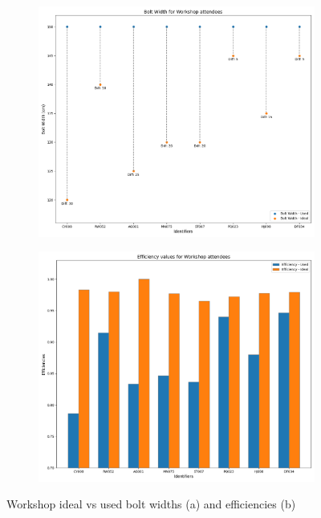 \begin{figure}[H]
    \centering
    \begin{subfigure}[b]{0.45\textwidth}
        \centering
        \includegraphics[width=\textwidth]{Images/Workshop_BoltWidths_Scatter.png}
        \caption{}
        \label{fig:workshop_bolt_widths}
    \end{subfigure}
    \vfill
    \begin{subfigure}[b]{0.45\textwidth}
        \centering
        \includegraphics[width=\textwidth]{Images/Workshop_Eff_bar.png}
        \caption{}
        \label{fig:workshop_efficiency_bar}
    \end{subfigure}
    \caption{Workshop ideal vs used bolt widths (a) and efficiencies (b)}
\end{figure}

